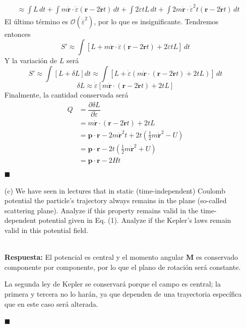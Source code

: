 \documentclass[]{article}
\numberwithin{equation}{section}
\newcommand{\0}{\textcolor{gray}{0}}
\newcommand{\rv}{\mathbf{r}}
\newcommand{\pv}{\mathbf{p}}
\newcommand{\pd}[2]{\dfrac{\partial #1}{\partial #2}}
\newcommand{\n}[1]{\mathbf{#1}}
\newcommand{\qed}{\hfill\(\blacksquare\)}
\newcommand{\resp}{
	\\
	
	\textbf{Respuesta:} }
\begin{document}
\begin{enumerate}
\begin{align*}
		&\approx \int L \, dt + \int m \dot{\rv} \cdot \dot{\varepsilon} \left(\rv - 2 \dot{\rv} t\right) \, dt + \int 2 \dot{\varepsilon} t L \, dt + \int 2 m \dot{\rv} \cdot \dot{\varepsilon}^2 t \left(\rv - 2 \dot{\rv} t\right) \, dt
	\end{align*}
	El último término es $\mathcal{O}(\dot{\varepsilon}^2)$, por lo que es insignificante. Tendremos entonces
	\begin{equation*}
		S' \approx \int \left[L + m \dot{\rv} \cdot \dot{\varepsilon} \left(\rv - 2 \dot{\rv} t\right) + 2 \dot{\varepsilon} t L\right] \, dt
	\end{equation*}
	Y la variación de $L$ será
	\begin{equation*}
		S' \approx \int \left[L + \delta L\right] dt \approx \int \left[L + \dot{\varepsilon} \left( m \dot{\rv} \cdot \left(\rv - 2 \dot{\rv} t\right) + 2 t L\right)\right] \, dt
	\end{equation*}
	\begin{equation*}
		\delta L \approx \dot{\varepsilon}\left[ m \dot{\rv} \cdot \left(\rv - 2 \dot{\rv} t\right) + 2 t L\right]
	\end{equation*}
	Finalmente, la cantidad conservada será
	\begin{align*}
		Q &= \pd{\delta L}{\dot{\varepsilon}}\\
		&= m \dot{\rv} \cdot \left(\rv - 2 \dot{\rv} t\right) + 2 t L\\
		&= \pv \cdot \rv - 2 m \dot{\rv}^2 t + 2 t \left(\frac{1}{2}m \dot{\rv}^2 - U\right)\\
		&= \pv \cdot \rv - 2 t \left(\frac{1}{2}m \dot{\rv}^2 + U\right)\\
		&= \pv \cdot \rv - 2 H t\\
	\end{align*}
	\qed
	
	
	\item[(c)] We have seen in lectures that in static (time-independent) Coulomb potential the particle's trajectory always remains in the plane (so-called scattering plane). Analyze if this property remains valid in the time-dependent potential given in Eq. (1). Analyze if the Kepler’s laws remain valid in this potential	field.
	\resp El potencial es central y el momento angular $\n{M}$ es conservado componente por componente, por lo que el plano de rotación será constante.
	
	La segunda ley de Kepler se conservará porque el campo es central; la primera y tercera no lo harán, ya que dependen de una trayectoria específica que en este caso será alterada.
	
	\qed
\end{enumerate}
\end{document}
